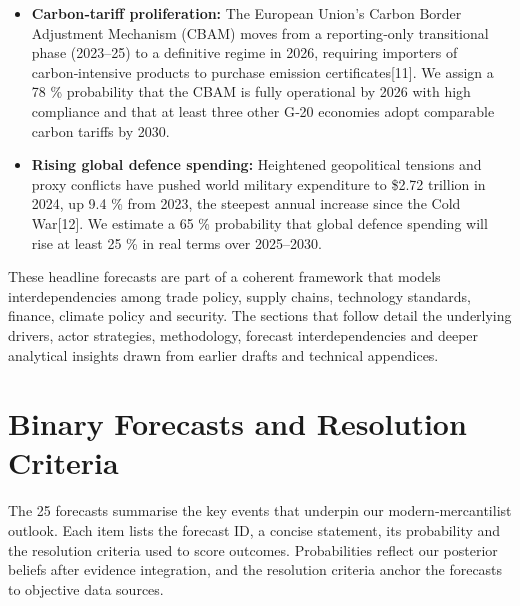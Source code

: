 \documentclass[12pt]{article}
\begin{document}
\begin{itemize}
\item \textbf{Carbon‑tariff proliferation:}  The European Union's Carbon Border Adjustment Mechanism (CBAM) moves from a reporting‑only transitional phase (2023–25) to a definitive regime in 2026, requiring importers of carbon‑intensive products to purchase emission certificates[11].  We assign a 78 \% probability that the CBAM is fully operational by 2026 with high compliance and that at least three other G‑20 economies adopt comparable carbon tariffs by 2030.

\item \textbf{Rising global defence spending:}  Heightened geopolitical tensions and proxy conflicts have pushed world military expenditure to \$2.72 trillion in 2024, up 9.4 \% from 2023, the steepest annual increase since the Cold War[12].  We estimate a 65 \% probability that global defence spending will rise at least 25 \% in real terms over 2025–2030.
\end{itemize}

These headline forecasts are part of a coherent framework that models interdependencies among trade policy, supply chains, technology standards, finance, climate policy and security.  The sections that follow detail the underlying drivers, actor strategies, methodology, forecast interdependencies and deeper analytical insights drawn from earlier drafts and technical appendices.

\clearpage

\section{Binary Forecasts and Resolution Criteria}

The 25 forecasts summarise the key events that underpin our modern‑mercantilist outlook.  Each item lists the forecast ID, a concise statement, its probability and the resolution criteria used to score outcomes.  Probabilities reflect our posterior beliefs after evidence integration, and the resolution criteria anchor the forecasts to objective data sources.
\end{document}

